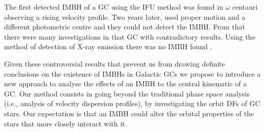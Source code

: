 \par The first detected \ac{IMBH} of a \ac{GC}  using the IFU method was found in \(\omega\) centauri \citep{2008ApJ...676.1008N} observing a rising velocity profile. Two years later, \citet{2010ApJ...710.1063V} used proper motion and a different photometric centre and they could not detect the \ac{IMBH}. From that there were many investigations in that \ac{GC} with contradictory results. Using the method of detection of X-ray emission there was no \ac{IMBH} found \citep{2015A&A...581A...1L}.
\par Given these controversial results that prevent us from drawing definite conclusions on the existence of \acp{IMBH} in Galactic \acp{GC} we propose to introduce a new approach to analyse the effects of an \ac{IMBH} to the central kinematic of a \ac{GC}. Our method consists in going beyond the traditional phase space analysis (i.e., analysis of velocity dispersion profiles), by investigating the orbit \acp{DF} of \ac{GC} stars. Our expectation is that an \ac{IMBH} could alter the orbital properties of the stars that more closely interact with it.
\\

